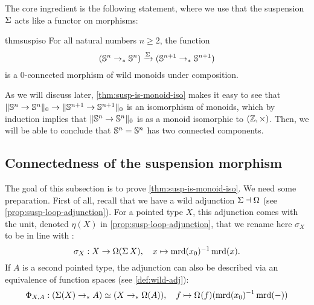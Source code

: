 \documentclass[english,a4paper]{lmcs}
\begin{document}
The core ingredient is the following statement,
where we use that the suspension $\operatorname{\Sigma}$ acts like a functor on morphisms:
\begin{restatable}{thm}{suspiso}
    \label{thm:susp-is-monoid-iso}
    For all natural numbers $n \geq 2$, the function
    \begin{equation} \label{eq:susp-monoid-morphism}
    ({\mathbb S^{n}} \to_* {\mathbb S^{n}}) \xrightarrow{\operatorname{\Sigma}} ({\mathbb S^{n+1}} \to_* {\mathbb S^{n+1}})
    \end{equation}
    is a $0$-connected morphism of wild monoids under composition.
\end{restatable}

As we will discuss later, \cref{thm:susp-is-monoid-iso} makes it easy to see
that $\lVert{\mathbb S^{n}} \to {\mathbb S^{n}}\rVert_0 \to \lVert{\mathbb S^{n+1}} \to {\mathbb S^{n+1}}\rVert_0$ is
an isomorphism of monoids, which by induction implies that $\lVert{\mathbb S^{n}}
\to {\mathbb S^{n}}\rVert_0$ is as a monoid isomorphic to $(\mathbb{Z}, \times)$. Then, we will be able
to conclude that ${\mathbb S^{n}} = {\mathbb S^{n}}$ has two connected components.

\subsection{Connectedness of the suspension morphism}
%
The goal of this subsection is to prove \cref{thm:susp-is-monoid-iso}. We need
some preparation.  First of all, recall that we have a wild adjunction $\operatorname{\Sigma}
\dashv \Omega$ (see \cref{prop:susp-loop-adjunction}).
%
For a pointed type $X$, this adjunction comes with the unit, denoted $\eta(X)$
in \cref{prop:susp-loop-adjunction}, that we rename here $\sigma_X$ to be in line
with \cite{HoTT}:
\begin{equation}  \label{eq:sigma}
  \sigma_X : X \to \Omega(\operatorname{\Sigma} X), \quad x \mapsto \operatorname{\mathrm{mrd}}(x_0)^{-1} \operatorname{\mathrm{mrd}}(x).
\end{equation}
If $A$ is a second pointed type, the adjunction can also be described via an
equivalence of function spaces (see \cref{def:wild-adj}):
\begin{equation}\label{eq:adj-equivalence-susp-loopspace}
  \Phi_{X,A} : (\susp(X) \ptdto A) \simeq (X \ptdto \Omega(A)),\quad
  f \mapsto \loopspace \null (f)(\inv{\mrd (x_0)} \mrd(\blank))
\end{equation}
\end{document}
